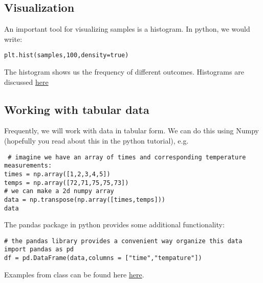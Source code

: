 \subsection{Visualization}

 An important tool for visualizing samples is a histogram. In python, we would write:
\begin{Verbatim}
plt.hist(samples,100,density=true)
 \end{Verbatim}
 The histogram shows us the frequency of different outcomes. Histograms are discussed \href{https://colab.research.google.com/drive/1Gs-gSsUP1hHVwhrbwvWzLVm1ulcLJKRI#scrollTo=UkD_oWqXUq_k}{here}
 
 \subsection{Working with tabular data}
 
 Frequently, we will work with data in tabular form. We can do this using Numpy (hopefully you read about this in the python tutorial), e.g. 
 \begin{Verbatim}
 # imagine we have an array of times and corresponding temperature measurements:
times = np.array([1,2,3,4,5])
temps = np.array([72,71,75,75,73])
# we can make a 2d numpy array 
data = np.transpose(np.array([times,temps]))
data
 \end{Verbatim}
 The pandas package in python provides some additional functionality:
 \begin{Verbatim}
# the pandas library provides a convenient way organize this data
import pandas as pd
df = pd.DataFrame(data,columns = ["time","tempature"])
 \end{Verbatim}

Examples from class can be found here \href{https://colab.research.google.com/drive/1Gs-gSsUP1hHVwhrbwvWzLVm1ulcLJKRI#scrollTo=UkD_oWqXUq_k}{here}.


